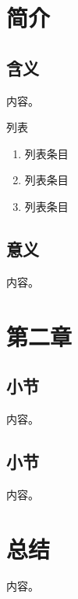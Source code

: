 \documentclass[a4paper,12pt]{report}
\begin{document}
\tableofcontents %

\chapter{简介}
\setcounter{page}{1}
\begin{spacing}{1.5}
\songti{}

	\section{含义}
	内容\cite{ref1}。
	
	列表
	\begin{enumerate}[(1)]
	\item 列表条目
	\item 列表条目
	\item 列表条目
	\end{enumerate}
	
	\section{意义}
	内容\cite{ref2}。
	
\end{spacing}

\chapter{第二章}
	\begin{spacing}{1.5}
	\songti{}
	
	\section{小节}
	内容。
	
	\section{小节}
	内容。
	
	\end{spacing}

\chapter{总结}
	\begin{spacing}{1.5}
	\songti{}
	 内容。
	\end{spacing}
\end{document}
